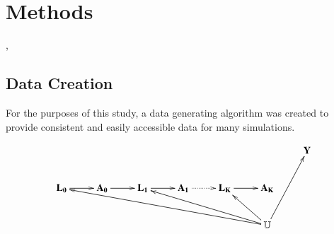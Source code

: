 
\chapter{Methods}

, 


\section{Data Creation} 
For the purposes of this study, a data generating algorithm was created to provide consistent and easily accessible data for many simulations.  

\begin{displaymath}
    \xymatrix{
    	& & & & & & \mathbf{Y} \\
        \mathbf{L_0} \ar[r] & \mathbf{A_0} \ar[r]  & \mathbf{ L_1} \ar[r]  & \mathbf{A_1} \ar@{.>}[r] & \mathbf{L_K} \ar[r] & \mathbf{A_K} &  \\ 
        & & & & & \ar[lllllu] \ar[lllu]  \ar[lu] \mathbb{U}  \ar[ruu]  & 
        }
\end{displaymath}

